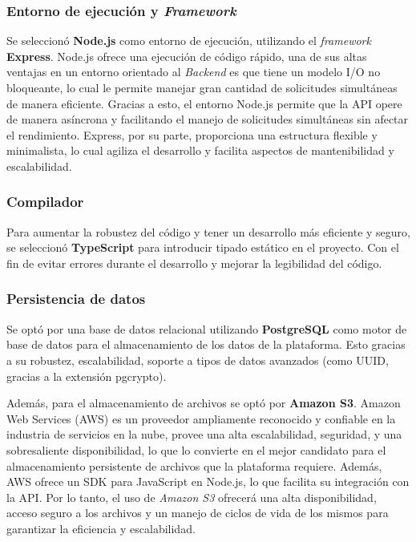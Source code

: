 \subsubsection{Entorno de ejecución y \textit{Framework}}
Se seleccionó \textbf{Node.js} como entorno de ejecución, utilizando el \textit{framework} \textbf{Express}.
Node.js ofrece una ejecución de código rápido, una de sus altas ventajas en un entorno orientado al
\textit{Backend} es que tiene un modelo I/O no bloqueante, lo cual le permite manejar gran cantidad de solicitudes
simultáneas de manera eficiente. Gracias a esto, el entorno Node.js permite que la API opere de manera 
asíncrona y facilitando el manejo de solicitudes simultáneas sin afectar el rendimiento.
Express, por su parte, proporciona una estructura flexible y minimalista, lo cual agiliza el desarrollo y facilita 
aspectos de mantenibilidad y escalabilidad.

\subsubsection{Compilador}
Para aumentar la robustez del código y tener un desarrollo más eficiente y seguro, se seleccionó \textbf{TypeScript}
para introducir tipado estático en el proyecto. Con el fin de evitar errores durante el desarrollo y mejorar la
legibilidad del código.

\subsubsection{Persistencia de datos}
Se optó por una base de datos relacional utilizando \textbf{PostgreSQL} como motor de base de datos para el
almacenamiento de los datos de la plataforma. Esto gracias a su robustez, escalabilidad, soporte a tipos de datos
avanzados (como UUID, gracias a la extensión pgcrypto).

Además, para el almacenamiento de archivos se optó por \textbf{Amazon S3}. Amazon Web Services (AWS) es un proveedor
ampliamente reconocido y confiable en la industria de servicios en la nube, provee una alta escalabilidad, seguridad,
y una sobresaliente disponibilidad, lo que lo convierte en el mejor candidato para el almacenamiento persistente de
archivos que la plataforma requiere. Además, AWS ofrece un SDK para JavaScript en Node.js, lo que facilita 
su integración con la API. Por lo tanto, el uso de \textit{Amazon S3} ofrecerá una alta disponibilidad, acceso seguro
a los archivos y un manejo de ciclos de vida de los mismos para garantizar la eficiencia y escalabilidad.

